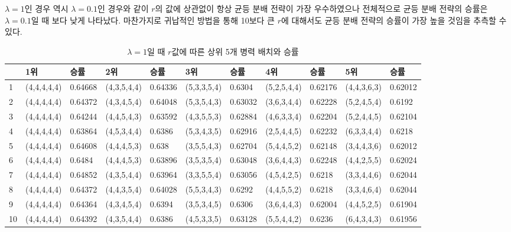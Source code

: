 $\lambda=1$인 경우 역시 $\lambda=0.1$인 경우와 같이 $r$의 값에 상관없이 항상 균등 분배 전략이 가장 우수하였으나 전체적으로 균등 분배 전략의 승률은 $\lambda=0.1$일 때 보다 낮게 나타났다. 마찬가지로 귀납적인 방법을 통해 10보다 큰 $r$에 대해서도 균등 분배 전략의 승률이 가장 높을 것임을 추측할 수 있다.\\
\begin{table}[htb!]
    \vspace{1em}
    \centering
    \caption{$\lambda = 1$일 때 $r$값에 따른 상위 5개 병력 배치와 승률}
    {\scriptsize
    \begin{tabular}{l|ll|ll|ll|ll|ll}
       & 1위       & 승률      & 2위       & 승률      & 3위       & 승률      & 4위       & 승률      & 5위       & 승률      \\ \hline
    1  & (4,4,4,4,4) & 0.64668 & (4,3,5,4,4) & 0.64336 & (5,3,3,5,4) & 0.6304  & (5,2,5,4,4) & 0.62176 & (4,4,3,6,3) & 0.62012 \\
    2  & (4,4,4,4,4) & 0.64372 & (4,3,4,5,4) & 0.64048 & (5,3,5,4,3) & 0.63032 & (3,6,3,4,4) & 0.62228 & (5,2,4,5,4) & 0.6192  \\
    3  & (4,4,4,4,4) & 0.64244 & (4,4,5,4,3) & 0.63592 & (4,3,5,5,3) & 0.62884 & (4,6,3,3,4) & 0.62204 & (5,2,4,4,5) & 0.62104 \\
    4  & (4,4,4,4,4) & 0.63864 & (4,5,3,4,4) & 0.6386  & (5,3,4,3,5) & 0.62916 & (2,5,4,4,5) & 0.62232 & (6,3,3,4,4) & 0.6218  \\
    5  & (4,4,4,4,4) & 0.64608 & (4,4,4,5,3) & 0.638   & (3,5,5,4,3) & 0.62704 & (5,4,4,5,2) & 0.62148 & (3,4,4,3,6) & 0.62012 \\
    6  & (4,4,4,4,4) & 0.6484  & (4,4,4,5,3) & 0.63896 & (3,5,3,5,4) & 0.63048 & (3,6,4,4,3) & 0.62248 & (4,4,2,5,5) & 0.62024 \\
    7  & (4,4,4,4,4) & 0.64852 & (4,3,5,4,4) & 0.63964 & (3,3,5,5,4) & 0.63056 & (4,5,4,2,5) & 0.6218  & (3,3,4,4,6) & 0.62044 \\
    8  & (4,4,4,4,4) & 0.64372 & (4,4,3,5,4) & 0.64028 & (5,5,3,4,3) & 0.6292  & (4,4,5,5,2) & 0.6218  & (3,3,4,6,4) & 0.62044 \\
    9  & (4,4,4,4,4) & 0.64364 & (4,3,4,5,4) & 0.6394  & (3,5,3,4,5) & 0.6306  & (3,6,4,4,3) & 0.62004 & (4,4,5,2,5) & 0.61904 \\
    10 & (4,4,4,4,4) & 0.64392 & (4,3,5,4,4) & 0.6386  & (4,5,3,3,5) & 0.63128 & (5,5,4,4,2) & 0.6236  & (6,4,3,4,3) & 0.61956
    \end{tabular}
    }
    \label{tab:my_label}
\end{table}

